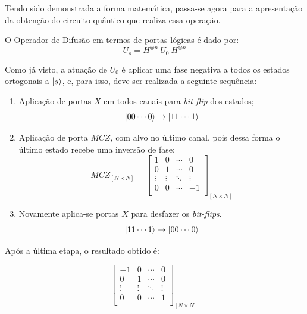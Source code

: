 Tendo sido demonstrada a forma matemática, passa-se agora para a apresentação da obtenção do circuito qu\^{a}ntico que realiza essa operação. 

O Operador de Difusão em termos de portas lógicas é dado por:
%
\begin{equation}
    U_s = H^{\otimes n}~U_0~H^{\otimes n}
    \label{gate: operadorDifusao}
\end{equation}

Como já visto, a atuação de $U_0$ é aplicar uma fase negativa a todos os estados ortogonais a $\ket{s}$, e, para isso, deve ser realizada a seguinte sequência:

\begin{enumerate}
\label{enum: difusor}
    \item Aplicação de portas $X$ em todos canais para \textit{bit-flip} dos estados;
    \[\ket{00\cdots0} \to \ket{11\cdots1} \]
    \item Aplicação de porta $MCZ$, com alvo no último canal, pois dessa forma o último estado recebe uma inversão de fase;
    \begin{equation}
    MCZ_{[N \times N]}  =
    \begin{bmatrix}
        1 & 0 &  \cdots  & 0\\
        0 & 1 &  \cdots  & 0\\
        \vdots & \vdots & \ddots & \vdots \\
        0 & 0 &  \cdots & -1\\
    \end{bmatrix}_{[N \times N]}
    \label{mtx: gateMCZ}
\end{equation}
    \item Novamente aplica-se portas $X$ para desfazer os \textit{bit-flips}.
    \[\ket{11\cdots1} \to \ket{00\cdots0} \]
\end{enumerate}

Após a última etapa, o resultado obtido é:

\begin{equation*}
    \begin{bmatrix}
        -1 & 0 &  \cdots  & 0\\
        0 & 1 &  \cdots  & 0\\
        \vdots & \vdots & \ddots & \vdots \\
        0 & 0 &  \cdots & 1\\
    \end{bmatrix}_{[N \times N]}
\end{equation*}

